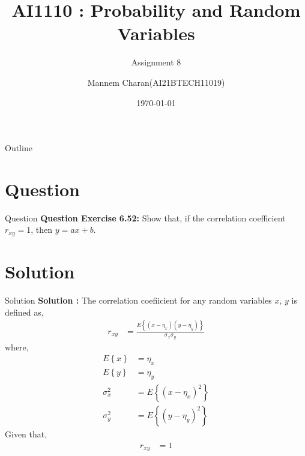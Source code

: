 \documentclass{beamer}
\title{AI1110 : Probability and Random Variables}
\subtitle{Assignment 8}
\author{Mannem Charan(AI21BTECH11019)}
\date{\today}
\providecommand{\brak}[1]{\ensuremath{\left(#1\right)}}
\providecommand{\cbrak}[1]{\ensuremath{\left\{#1\right\}}}
\begin{document}
\begin{frame}
    \titlepage 
\end{frame}


\begin{frame}{Outline}
    \tableofcontents
\end{frame}


\section{Question}
\begin{frame}{Question}
\textbf{Question Exercise 6.52:} Show that, if the correlation coefficient $r_{xy} = 1$, then $y = ax + b$.

\end{frame}

\section{Solution}
\begin{frame}{Solution}
\textbf{Solution :}
The correlation coefiicient for any random variables $x$, $y$ is defined as,
    \begin{align}
        r_{xy} &=\frac{ E\cbrak{\brak{x - \eta_{x}}\brak{y-\eta_{y}}}}{\sigma_{x}\sigma_{y}}
    \end{align}
where, 
    \begin{align}
          E\cbrak{x} &= \eta_{x}\\
          E\cbrak{y} &= \eta_{y}\\
         \sigma_{x}^{2} &= E\cbrak{\brak{x-\eta_{x}}^{2}}\label{eq:4}\\
         \sigma_{y}^{2} &= E\cbrak{\brak{y-\eta_{y}}^{2}} \label{eq:5}
    \end{align}
Given that, 
     \begin{align}
              r_{xy} &= 1
     \end{align} 
\end{frame}
\end{document}
